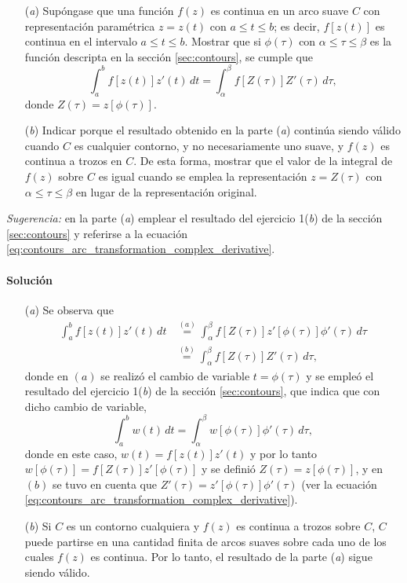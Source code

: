 \documentclass[a4paper]{report}
\begin{document}
\begin{enumerate}
 \item[(\textit{a})] Supóngase que una función \(f(z)\) es continua en un arco suave \(C\) con representación paramétrica \(z=z(t)\) con \(a\leq t\leq b\); es decir, \(f[z(t)]\) es continua en el intervalo \(a\leq t\leq b\). Mostrar que si \(\phi(\tau)\) con \(\alpha\leq\tau\leq\beta\) es la función descripta en la sección \ref{sec:contours}, se cumple que 
 \[
  \int_a^bf[z(t)]z'(t)\,dt=\int_\alpha^\beta f[Z(\tau)]Z'(\tau)\,d\tau,
 \]
 donde \(Z(\tau)=z[\phi(\tau)]\).
 \item[(\textit{b})] Indicar porque el resultado obtenido en la parte (\textit{a}) continúa siendo válido cuando \(C\) es cualquier contorno, y no necesariamente uno suave, y \(f(z)\) es continua a trozos en \(C\). De esta forma, mostrar que el valor de la integral de \(f(z)\) sobre \(C\) es igual cuando se emplea la representación \(z=Z(\tau)\) con \(\alpha\leq\tau\leq\beta\) en lugar de la representación original.
\end{enumerate}

\emph{Sugerencia:} en la parte (\textit{a}) emplear el resultado del ejercicio 1(\textit{b}) de la sección \ref{sec:contours} y referirse a la ecuación \ref{eq:contours_arc_transformation_complex_derivative}.

\paragraph{Solución} 

\begin{enumerate}
 \item[(\textit{a})] Se observa que 
 \begin{align*}
  \int_a^bf[z(t)]z'(t)\,dt&\overset{(a)}{=}\int_\alpha^\beta f[Z(\tau)]z'[\phi(\tau)]\phi'(\tau)\,d\tau\\
   &\overset{(b)}{=}\int_\alpha^\beta f[Z(\tau)]Z'(\tau)\,d\tau,
 \end{align*}
 donde en \((a)\) se realizó el cambio de variable \(t=\phi(\tau)\) y se empleó el resultado del ejercicio 1(\textit{b}) de la sección \ref{sec:contours}, que indica que con dicho cambio de variable,
 \[
  \int_{a}^{b}w(t)\,dt=\int_\alpha^\beta w[\phi(\tau)]\phi'(\tau)\,d\tau,
 \]
 donde en este caso, \(w(t)=f[z(t)]z'(t)\) y por lo tanto \(w[\phi(\tau)]=f[Z(\tau)]z'[\phi(\tau)]\) y se definió \(Z(\tau)=z[\phi(\tau)]\), y en \((b)\) se tuvo en cuenta que \(Z'(\tau)=z'[\phi(\tau)]\phi'(\tau)\) (ver la ecuación \ref{eq:contours_arc_transformation_complex_derivative}).
 \item[(\textit{b})] Si \(C\) es un contorno cualquiera y \(f(z)\) es continua a trozos sobre \(C\), \(C\) puede partirse en una cantidad finita de arcos suaves sobre cada uno de los cuales \(f(z)\) es continua. Por lo tanto, el resultado de la parte (\textit{a}) sigue siendo válido.
\end{enumerate}
\end{document}
